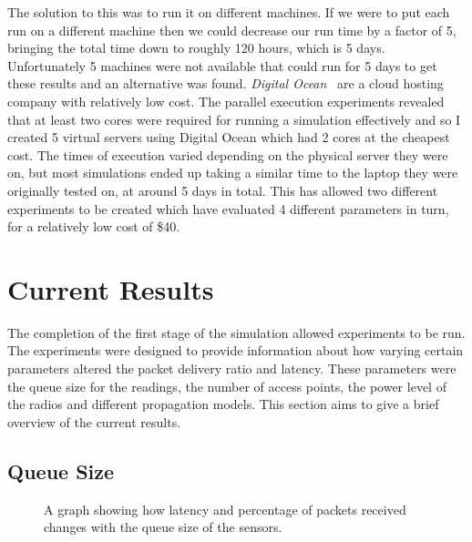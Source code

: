 \documentclass[12pt,a4paper,notitlepage]{article}
\begin{document}
The solution to this was to run it on different machines. If we were to put each run on a different machine then we could decrease our run time by a factor of 5, bringing the total time down to roughly 120 hours, which is 5 days. Unfortunately 5 machines were not available that could run for 5 days to get these results  and an alternative was found. \emph{Digital Ocean}~\cite{digitalocean} are a cloud hosting company with relatively low cost. The parallel execution experiments revealed that at least two cores were required for running a simulation effectively and so I created 5 virtual servers using Digital Ocean which had 2 cores at the cheapest cost. The times of execution varied depending on the physical server they were on, but most simulations ended up taking a similar time to the laptop they were originally tested on, at around 5 days in total. This has allowed two different experiments to be created which have evaluated 4 different parameters in turn, for a relatively low cost of \$40.

\section{Current Results}

The completion of the first stage of the simulation allowed experiments to be run. The experiments were designed to provide information about how varying certain parameters altered the packet delivery ratio and latency. These parameters were the queue size for the readings, the number of access points, the power level of the radios and different propagation models. This section aims to give a brief overview of the current results.

\subsection{Queue Size}

\begin{figure}[H]
    \begin{center}
        \caption{A graph showing how latency and percentage of packets received changes with the queue size of the sensors.}
        \label{fig:queuesize}
    \end{center}
\end{figure}
\end{document}
